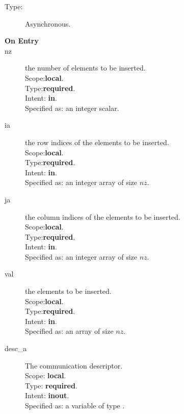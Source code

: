 \begin{description}
\item[Type:] Asynchronous.
\item[\bf On Entry]
\item[nz] the number of elements to be inserted.\\
Scope:{\bf local}.\\
Type:{\bf required}.\\
Intent: {\bf in}.\\
Specified as: an integer scalar.
\item[ia] the row indices of the elements to be inserted.\\
Scope:{\bf local}.\\
Type:{\bf required}.\\
Intent: {\bf in}.\\
Specified as: an integer array of size $nz$.
\item[ja] the column indices of the elements to be inserted.\\
Scope:{\bf local}.\\
Type:{\bf required}.\\
Intent: {\bf in}.\\
Specified as: an integer array of size $nz$.
\item[val] the elements to be inserted.\\
Scope:{\bf local}.\\
Type:{\bf required}.\\
Intent: {\bf in}.\\
Specified as: an array of size $nz$.
\item[desc\_a] The communication descriptor.\\
Scope: {\bf local}. \\
Type: {\bf required}.\\
Intent: {\bf inout}.\\
Specified as: a variable of type \descdata.\\
\end{description}

